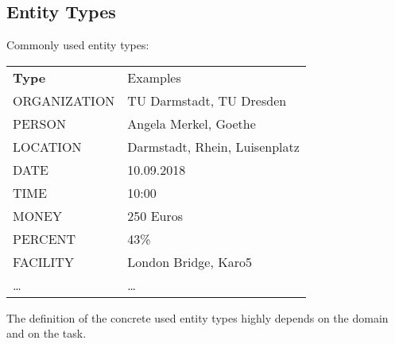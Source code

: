 \documentclass[a4paper, 11pt, accentcolor = tud3b]{tudreport}
\begin{document}
            \subsection{Entity Types} %
                Commonly used entity types:
                \begin{table}[H]
                	\centering
                	\begin{tabular}{l l}
                		\textbf{Type} & Examples                      \\
                		ORGANIZATION  & TU Darmstadt, TU Dresden      \\
                		PERSON        & Angela Merkel, Goethe         \\
                		LOCATION      & Darmstadt, Rhein, Luisenplatz \\
                		DATE          & 10.09.2018                    \\
                		TIME          & 10:00                         \\
                		MONEY         & 250 Euros                     \\
                		PERCENT       & 43\%                          \\
                		FACILITY      & London Bridge, Karo5          \\
                		\dots         & \dots
                	\end{tabular}
                \end{table}
            	The definition of the concrete used entity types highly depends on the domain and on the task.
\end{document}
